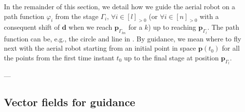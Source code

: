 In the remainder of this section, we detail how we guide the aerial robot on a path function $\varphi_i$ from the stage $\Gamma_i,\,\forall i\in[l]_{>0}$ (or $\forall i\in[n]_{>0}$ with a consequent shift of $\mathbf{d}$ when we reach $\mathbf{p}_{\Gamma_{kn}}$ for a $k$) up to reaching $\mathbf{p}_{\Gamma_l}$. The path function can be, e.g., the circle and line in . By guidance, we mean where to fly next with the aerial robot starting from an initial point in space $\mathbf{p}(t_0)$ for all the points from the first time instant $t_0$ up to the final stage at position $\mathbf{p}_{\Gamma_l}$.

---

\subsection{Vector fields for guidance}

